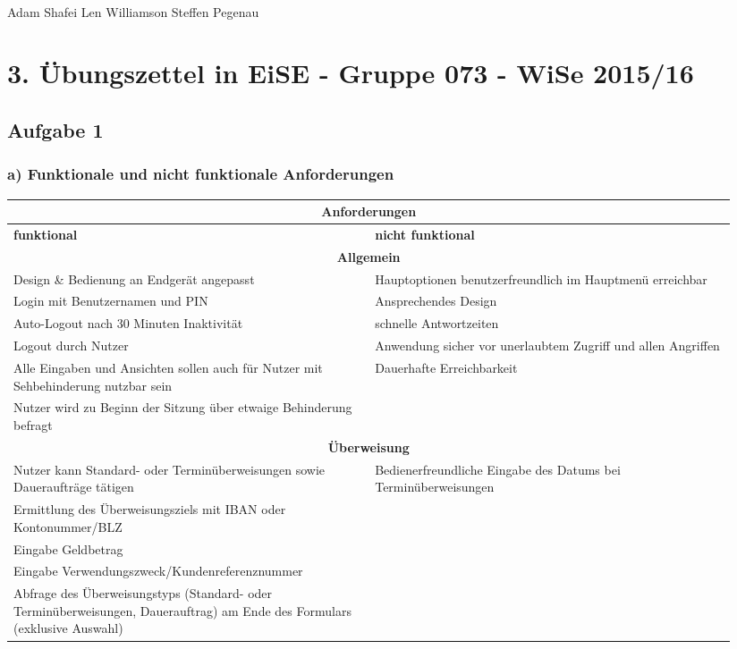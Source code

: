 \documentclass[a4paper,10pt]{article}
\begin{document}
\hfill \\
Adam Shafei \hfill Len Williamson \hfill Steffen Pegenau
\section*{3. Übungszettel in EiSE \-- Gruppe 073 \-- WiSe 2015/16}
\subsection*{Aufgabe 1}
\subsubsection*{a) Funktionale und nicht funktionale Anforderungen}
\begin{longtable}{|p{0.47\linewidth}|p{0.47\linewidth}|}
\hline
\multicolumn{2}{|c|}{\textbf{Anforderungen}} \\
\hline
\textbf{funktional} & \textbf{nicht funktional} \\
\hline
\hline
\multicolumn{2}{|c|}{\textbf{Allgemein}} \\
\hline
Design \& Bedienung an Endgerät angepasst & Hauptoptionen benutzerfreundlich im Hauptmenü erreichbar \\
\hline
Login mit Benutzernamen und PIN & Ansprechendes Design \\
\hline
Auto-Logout nach 30 Minuten Inaktivität & schnelle Antwortzeiten \\
\hline
Logout durch Nutzer & Anwendung sicher vor unerlaubtem Zugriff und allen Angriffen\\
\hline
Alle Eingaben und Ansichten sollen auch für Nutzer mit Sehbehinderung nutzbar sein & Dauerhafte Erreichbarkeit \\
\hline
Nutzer wird zu Beginn der Sitzung über etwaige Behinderung befragt & \\
\hline
\hline
\multicolumn{2}{|c|}{\textbf{Überweisung}} \\
\hline
Nutzer kann Standard- oder Terminüberweisungen sowie Daueraufträge tätigen & Bedienerfreundliche Eingabe des Datums bei Terminüberweisungen \\
\hline
Ermittlung des Überweisungsziels mit IBAN oder Kontonummer/BLZ & \\
\hline
Eingabe Geldbetrag & \\
\hline
Eingabe Verwendungszweck/Kundenreferenznummer & \\
\hline
Abfrage des Überweisungstyps (Standard- oder Terminüberweisungen, Dauerauftrag) am Ende des Formulars (exklusive Auswahl) & \\

\end{longtable}
\end{document}

